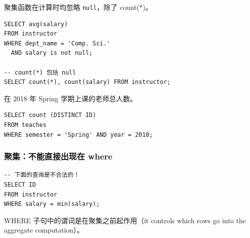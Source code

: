 \documentclass[aspectratio=169, 14pt]{beamer}
\begin{document}
\begin{frame}[fragile]
	聚集函数在计算时均忽略 \texttt{null}，除了 \alert{count(*)}。
	\begin{verbatim}
SELECT avg(salary)
FROM instructor
WHERE dept_name = 'Comp. Sci.' 
  AND salary is not null;

-- count(*) 包括 null
SELECT count(*), count(salary) FROM instructor;
\end{verbatim}


\end{frame}

\begin{frame}[fragile]
	在 2018 年 Spring 学期上课的老师总人数。

	\begin{verbatim}
SELECT count (DISTINCT ID)
FROM teaches
WHERE semester = 'Spring' AND year = 2018;
\end{verbatim}


\end{frame}

\begin{frame}[fragile]
	\frametitle{聚集：不能直接出现在 where}

	\begin{verbatim}
-- 下面的查询是不合法的！
SELECT ID
FROM instructor
WHERE salary = min(salary);
    \end{verbatim}

	WHERE 子句中的谓词是在聚集之前起作用（it controls which rows go into the aggregate computation）。

\end{frame}
\end{document}
